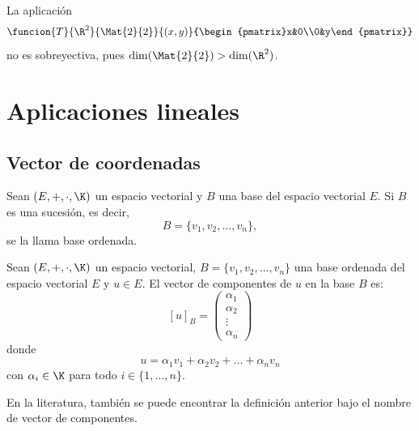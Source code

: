 \documentclass[compacto,10pt]{pubciencias-notas}
\begin{document}
\begin{ejem}\hspace{0pt}
La aplicación
\[
    \funcion{T}{\R^2}{\Mat{2}{2}}{(x,y)}{\begin{pmatrix}x&0\\0&y\end{pmatrix}}
\]
no es sobreyectiva, pues $\dim(\Mat{2}{2}) > \dim(\R^{2})$.
\end{ejem}

\setcounter{section}{5}
\section{Aplicaciones lineales}
\setcounter{subsection}{4}
\subsection{Vector de coordenadas}

\begin{defi}
    Sean $(E,+,\cdot,\K)$ un espacio vectorial y $B$ una base del espacio vectorial $E$. Si $B$ es una sucesión, es decir,
    \[
        B = \{v_1,v_2,\ldots,v_n\},
    \]
    se la llama base ordenada.
\end{defi}

\begin{defi}
    Sean $(E,+,\cdot,\K)$ un espacio vectorial, $B = \{v_1,v_2,\ldots,v_n\}$ una base ordenada del espacio vectorial $E$ y $u\in E$. El vector de componentes de $u$ en la base $B$ es:
    \[
    [u]_{B}=    \begin{pmatrix}
            \alpha_1\\\alpha_2\\\vdots\\\alpha_n
        \end{pmatrix}
    \]
    donde
    \[
        u = \alpha_1 v_1+\alpha_2 v_2+\ldots+\alpha_n v_n
    \]
    con $\alpha_{i} \in \K$ para todo $i\in\{1,\ldots,n\}$.
\end{defi}

\begin{advertencia}
    En la literatura, también se puede encontrar la definición anterior bajo el nombre de vector de componentes.
\end{advertencia}
\end{document}
